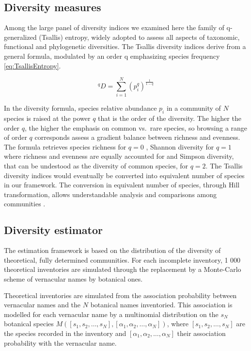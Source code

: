 \documentclass[fleqn,10pt]{ArtEcoFoG} %
\begin{document}
\subsection{Diversity measures}\label{diversity-measures}

Among the large panel of diversity indices we examined here the family
of q-generalized (Tsallis) entropy, widely adopted to assess all aspects
of taxonomic, functional and phylogenetic diversities. The Tsallis
diversity indices derive from a general formula, modulated by an order q
emphasizing species frequency \eqref{eq:TsallisEntropy}.

\begin{equation}
^qD = \sum_{i=1}^{N}{\left( p_i^q \right)^{\frac{1}{1-q}} }
\label{eq:TsallisEntropy}
\end{equation}

In the diversity formula, species relative abundance \(p_i\) in a
community of \(N\) species is raised at the power \(q\) that is the
order of the diversity. The higher the order \(q\), the higher the
emphasis on common vs.~rare species, so browsing a range of order \(q\)
corresponds assess a gradient balance between richness and evenness. The
formula retrieves species richness for \(q = 0\) , Shannon diversity for
\(q = 1\) where richness and evenness are equally accounted for and
Simpson diversity, that can be undestood as the diversity of common
species, for \(q = 2\). The Tsallis diversity indices would eventually
be converted into equivalent number of species in our framework. The
conversion in equivalent number of species, through Hill transformation,
allows understandable analysis and comparisons among communities
\citep{Hill1973, Keylock2005, Jost2006}.

\subsection{Diversity estimator}\label{diversity-estimator}

The estimation framework is based on the distribution of the diversity
of theoretical, fully determined communities. For each incomplete
inventory, 1 000 theoretical inventories are simulated through the
replacement by a Monte-Carlo scheme of vernacular names by botanical
ones.

Theoretical inventories are simulated from the association probability
between vernacular names and the \(N\) botanical names inventoried. This
association is modelled for each vernacular name by a multinomial
distribution on the \(s_N\) botanical species
\(M([s_1, s_2, …, s_N] ,[\alpha_1, \alpha_2,…, \alpha_N])\), where
\([s_1, s_2, …, s_N]\) are the species recorded in the inventory and
\([\alpha_1, \alpha_2,…, \alpha_N]\) their association probability with
the vernacular name.
\end{document}
